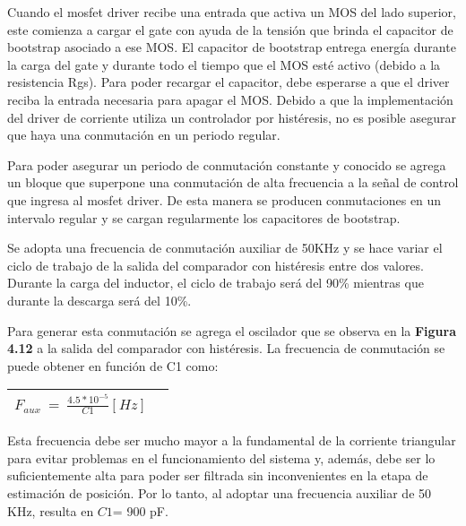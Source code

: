 \documentclass{article} %
\begin{document}
\noindent Cuando el mosfet driver recibe una entrada que activa un MOS del lado superior, este comienza a cargar el gate con ayuda de la tensi\'{o}n que brinda el capacitor de bootstrap asociado a ese MOS. El capacitor de bootstrap entrega energ\'{i}a durante la carga del gate y durante todo el tiempo que el MOS est\'{e} activo (debido a la resistencia Rgs). Para poder recargar el capacitor, debe esperarse a que el driver reciba la entrada necesaria para apagar el MOS. Debido a que la implementaci\'{o}n del driver de corriente utiliza un controlador por hist\'{e}resis, no es posible asegurar que haya una conmutaci\'{o}n en un periodo regular.

\noindent 

\noindent Para poder asegurar un periodo de conmutaci\'{o}n constante y conocido se agrega un bloque que superpone una conmutaci\'{o}n de alta frecuencia a la se\~{n}al de control que ingresa al mosfet driver. De esta manera se producen conmutaciones en un intervalo regular y se cargan regularmente los capacitores de bootstrap. 

\noindent 

\noindent Se adopta una frecuencia de conmutaci\'{o}n auxiliar de 50KHz y se hace variar el ciclo de trabajo de la salida del comparador con hist\'{e}resis entre dos valores. Durante la carga del inductor, el ciclo de trabajo ser\'{a} del 90\% mientras que durante la descarga ser\'{a} del 10\%.

\noindent 

\noindent Para generar esta conmutaci\'{o}n se agrega el oscilador que se observa en la \textbf{Figura 4.12} a la salida del comparador con hist\'{e}resis. La frecuencia de conmutaci\'{o}n se puede obtener en funci\'{o}n de C1 como:

\noindent 

\begin{tabular}{|p{3.9in}|p{0.4in}|} \hline 
${{F_{aux}}}\ =\ \frac{4.5*10^{-5}}{C1}[Hz]$ &   \\ \hline 
\end{tabular}

Esta frecuencia debe ser mucho mayor a la fundamental de la corriente triangular para evitar problemas en el funcionamiento del sistema y, adem\'{a}s, debe ser lo suficientemente alta para poder ser filtrada sin inconvenientes en la etapa de estimaci\'{o}n de posici\'{o}n. Por lo tanto, al adoptar una frecuencia auxiliar de 50 KHz, resulta en $C1$= 900 pF.

\noindent 
\end{document}

